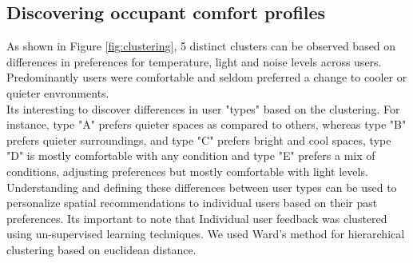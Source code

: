 
\subsection{Discovering occupant comfort profiles}
 
As shown in Figure \ref{fig:clustering}, 5 distinct clusters can be observed based on differences in preferences for temperature, light and noise levels across users. Predominantly users were comfortable and seldom preferred a change to cooler or quieter envronments.\\

Its interesting to discover differences in user "types" based on the clustering. For instance, type "A" prefers quieter spaces as compared to others, whereas type "B" prefers quieter surroundings, and type "C" prefers bright and cool spaces, type "D" is mostly comfortable with any condition and type "E" prefers a mix of conditions, adjusting preferences but mostly comfortable with light levels.\\ 

Understanding and defining these differences between user types can be used to personalize spatial recommendations to individual users based on their past preferences. Its important to note that Individual user feedback was clustered using un-supervised learning techniques. We used Ward's method for hierarchical clustering based on euclidean distance.\\ 







